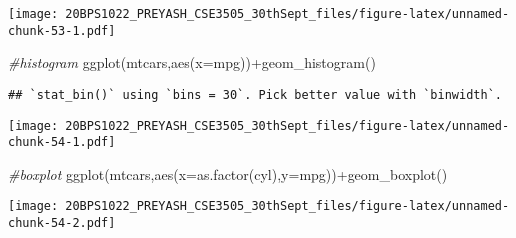 \documentclass[
]{article}
\newenvironment{Shaded}{\begin{snugshade}}{\end{snugshade}}
\newcommand{\AttributeTok}[1]{\textcolor[rgb]{0.77,0.63,0.00}{#1}}
\newcommand{\CommentTok}[1]{\textcolor[rgb]{0.56,0.35,0.01}{\textit{#1}}}
\newcommand{\FunctionTok}[1]{\textcolor[rgb]{0.00,0.00,0.00}{#1}}
\newcommand{\NormalTok}[1]{#1}
\newcommand{\SpecialCharTok}[1]{\textcolor[rgb]{0.00,0.00,0.00}{#1}}
\begin{document}
\texttt{[image: 20BPS1022\_PREYASH\_CSE3505\_30thSept\_files/figure-latex/unnamed-chunk-53-1.pdf]}

\begin{Shaded}
\begin{Highlighting}[]
\CommentTok{\#histogram}
\FunctionTok{ggplot}\NormalTok{(mtcars,}\FunctionTok{aes}\NormalTok{(}\AttributeTok{x=}\NormalTok{mpg))}\SpecialCharTok{+}\FunctionTok{geom\_histogram}\NormalTok{()}
\end{Highlighting}
\end{Shaded}

\begin{verbatim}
## `stat_bin()` using `bins = 30`. Pick better value with `binwidth`.
\end{verbatim}

\texttt{[image: 20BPS1022\_PREYASH\_CSE3505\_30thSept\_files/figure-latex/unnamed-chunk-54-1.pdf]}

\begin{Shaded}
\begin{Highlighting}[]
\CommentTok{\#boxplot}
\FunctionTok{ggplot}\NormalTok{(mtcars,}\FunctionTok{aes}\NormalTok{(}\AttributeTok{x=}\FunctionTok{as.factor}\NormalTok{(cyl),}\AttributeTok{y=}\NormalTok{mpg))}\SpecialCharTok{+}\FunctionTok{geom\_boxplot}\NormalTok{()}
\end{Highlighting}
\end{Shaded}

\texttt{[image: 20BPS1022\_PREYASH\_CSE3505\_30thSept\_files/figure-latex/unnamed-chunk-54-2.pdf]}
\end{document}
